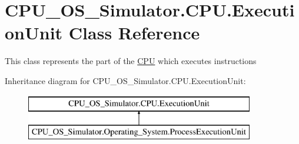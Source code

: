 \hypertarget{class_c_p_u___o_s___simulator_1_1_c_p_u_1_1_execution_unit}{}\section{C\+P\+U\+\_\+\+O\+S\+\_\+\+Simulator.\+C\+P\+U.\+Execution\+Unit Class Reference}
\label{class_c_p_u___o_s___simulator_1_1_c_p_u_1_1_execution_unit}


This class represents the part of the \hyperlink{namespace_c_p_u___o_s___simulator_1_1_c_p_u}{C\+P\+U} which executes instructions  


Inheritance diagram for C\+P\+U\+\_\+\+O\+S\+\_\+\+Simulator.\+C\+P\+U.\+Execution\+Unit\+:\begin{figure}[H]
\begin{center}
\leavevmode
\includegraphics[height=2.000000cm]{class_c_p_u___o_s___simulator_1_1_c_p_u_1_1_execution_unit}
\end{center}
\end{figure}
